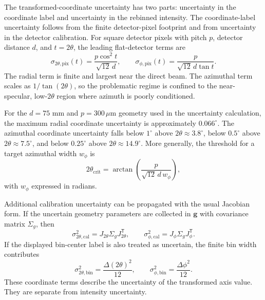 The transformed-coordinate uncertainty has two parts: uncertainty in the coordinate label and uncertainty in the rebinned intensity. The coordinate-label uncertainty follows from the finite detector-pixel footprint and from uncertainty in the detector calibration. For square detector pixels with pitch $p$, detector distance $d$, and $t=2\theta$, the leading flat-detector terms are
\begin{equation}
\sigma_{2\theta,\mathrm{pix}}(t)=
\frac{p\cos^{2}t}{\sqrt{12}\,d},
\qquad
\sigma_{\phi,\mathrm{pix}}(t)=
\frac{p}{\sqrt{12}\,d\tan t}.
\end{equation}
The radial term is finite and largest near the direct beam. The azimuthal term scales as $1/\tan(2\theta)$, so the problematic regime is confined to the near-specular, low-$2\theta$ region where azimuth is poorly conditioned.

For the $d=75$ mm and $p=300\,\mu\mathrm{m}$ geometry used in the uncertainty calculation, the maximum radial coordinate uncertainty is approximately $0.066^{\circ}$. The azimuthal coordinate uncertainty falls below $1^{\circ}$ above $2\theta\approx3.8^{\circ}$, below $0.5^{\circ}$ above $2\theta\approx7.5^{\circ}$, and below $0.25^{\circ}$ above $2\theta\approx14.9^{\circ}$. More generally, the threshold for a target azimuthal width $w_{\phi}$ is
\begin{equation}
2\theta_{\mathrm{crit}}=\arctan\!\left(\frac{p}{\sqrt{12}\,d\,w_{\phi}}\right),
\end{equation}
with $w_{\phi}$ expressed in radians.

Additional calibration uncertainty can be propagated with the usual Jacobian form. If the uncertain geometry parameters are collected in $\mathbf g$ with covariance matrix $\Sigma_g$, then
\begin{equation}
\sigma^2_{2\theta,\mathrm{cal}}=
J_{2\theta}\Sigma_gJ_{2\theta}^{\mathsf T},
\qquad
\sigma^2_{\phi,\mathrm{cal}}=
J_{\phi}\Sigma_gJ_{\phi}^{\mathsf T}.
\end{equation}
If the displayed bin-center label is also treated as uncertain, the finite bin width contributes
\begin{equation}
\sigma^2_{2\theta,\mathrm{bin}}=\frac{\Delta(2\theta)^2}{12},
\qquad
\sigma^2_{\phi,\mathrm{bin}}=\frac{\Delta\phi^2}{12}.
\end{equation}
These coordinate terms describe the uncertainty of the transformed axis value. They are separate from intensity uncertainty.

